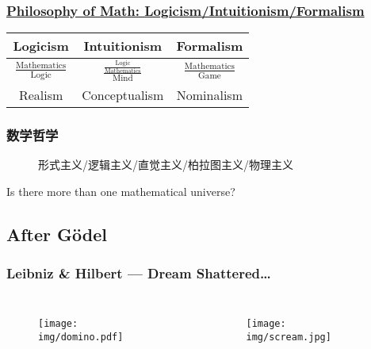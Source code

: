 \documentclass[UTF8,aspectratio=43,11pt,colorlinks,compress,openany]{beamer}%
\begin{document}
\begin{frame}\frametitle{\href{https://www.maa.org/programs/maa-awards/writing-awards/the-three-crises-in-mathematics-logicism-intuitionism-and-formalism}{Philosophy of Math: Logicism/Intuitionism/Formalism}}
\begin{figure}
\end{figure}
\begin{table}
\begin{tabu}{c|c|c}
\hline
Logicism & Intuitionism & Formalism\\
\hline
$\frac{\operatorname{Mathematics}}{\operatorname{Logic}}$ & $\frac{\frac{\operatorname{Logic}}{\operatorname{Mathematics}}}{\operatorname{Mind}}$ & $\frac{\operatorname{Mathematics}}{\operatorname{Game}}$\\
\hline
Realism & Conceptualism & Nominalism\\
\hline
\end{tabu}
\end{table}
\end{frame}

\begin{frame}\frametitle{数学哲学}
\begin{figure}[H]
\caption{形式主义/逻辑主义/直觉主义/柏拉图主义/物理主义}
\end{figure}
\centerline{Is there more than one mathematical universe?}
\end{frame}

\subsection{After G\"odel}

\begin{frame}\frametitle{Leibniz \& Hilbert --- Dream Shattered\dots}
\begin{columns}
	\begin{figure}
		\texttt{[image: img/domino.pdf]}
	\end{figure}
	\begin{figure}
		\texttt{[image: img/scream.jpg]}
	\end{figure}
\end{columns}
\end{frame}
\end{document}
